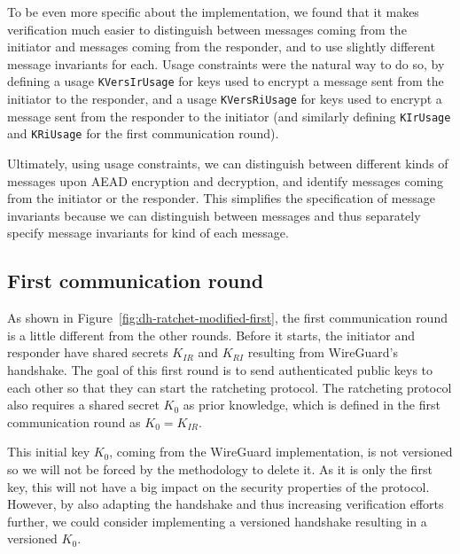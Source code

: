 To be even more specific about the implementation, we found that it makes verification much easier to distinguish between messages coming from the initiator and messages coming from the responder, and to use slightly different message invariants for each.
Usage constraints were the natural way to do so, by defining a usage \texttt{KVersIrUsage} for keys used to encrypt a message sent from the initiator to the responder, and a usage \texttt{KVersRiUsage} for keys used to encrypt a message sent from the responder to the initiator (and similarly defining \texttt{KIrUsage} and \texttt{KRiUsage} for the first communication round).

Ultimately, using usage constraints, we can distinguish between different kinds of messages upon AEAD encryption and decryption, and identify messages coming from the initiator or the responder.
This simplifies the specification of message invariants because we can distinguish between messages and thus separately specify message invariants for kind of each message.

\subsection{First communication round}
\label{sec:first-communication-round}

As shown in Figure~\ref{fig:dh-ratchet-modified-first}, the first communication round is a little different from the other rounds.
Before it starts, the initiator and responder have shared secrets $K_{IR}$ and $K_{RI}$ resulting from WireGuard's handshake.
The goal of this first round is to send authenticated public keys to each other so that they can start the ratcheting protocol.
The ratcheting protocol also requires a shared secret $K_0$ as prior knowledge, which is defined in the first communication round as $K_0 = K_{IR}$.

This initial key $K_0$, coming from the WireGuard implementation, is not versioned so we will not be forced by the methodology to delete it. As it is only the first key, this will not have a big impact on the security properties of the protocol.
However, by also adapting the handshake and thus increasing verification efforts further, we could consider implementing a versioned handshake resulting in a versioned $K_0$.

